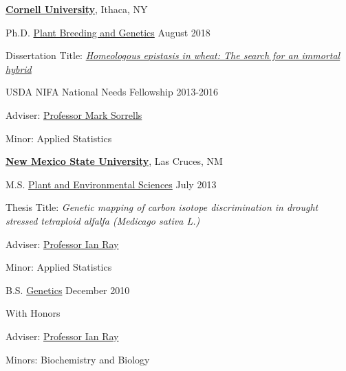 \documentclass[10pt]{article}
\newcommand{\blankline}{\quad\pagebreak[3]}
\newcommand{\halfblankline}{\quad\vspace{-0.5\baselineskip}\pagebreak[3]}
\begin{document}
\href{https://www.cornell.edu/}{\textbf{Cornell University}},
Ithaca, NY
\begin{outerlist}

\item[] Ph.D.
        \href{https://plbrgen.cals.cornell.edu/}
             {Plant Breeding and Genetics} \hfill August 2018
        \begin{innerlist}
        \item Dissertation Title: \href{https://ecommons.cornell.edu/handle/1813/59754}{\emph{Homeologous epistasis in wheat: The search for an immortal hybrid}}%
        \item USDA NIFA National Needs Fellowship 2013-2016
         \item Adviser:
              \href{https://plbrgen.cals.cornell.edu/people/mark-sorrells}
                   {Professor Mark Sorrells}
        \item Minor: Applied Statistics
        \end{innerlist}
        \halfblankline
\end{outerlist}

\blankline

\href{https://www.nmsu.edu/}{\textbf{New Mexico State University}},
Las Cruces, NM
\begin{outerlist}

\item[] M.S.
        \href{https://www.nmsu.edu/}
             {Plant and Environmental Sciences} \hfill July 2013
        \begin{innerlist}
        \item Thesis Title: \emph{Genetic mapping of carbon isotope discrimination in drought stressed tetraploid alfalfa (\emph{Medicago sativa} L.)}
        \item Adviser:
              \href{http://aces.nmsu.edu/academics/pes/ian-ray.html}
                   {Professor Ian Ray}
        \item Minor: Applied Statistics
        \end{innerlist}

\item[] B.S.
        \href{http://aces.nmsu.edu/academics/pes/genetics-degree.html}
             {Genetics} \hfill December 2010
        \begin{innerlist}
        \item With Honors
        \item Adviser:
              \href{http://aces.nmsu.edu/academics/pes/ian-ray.html}
                   {Professor Ian Ray}
        \item Minors: Biochemistry and Biology
        \end{innerlist}

\end{outerlist}
\end{document}
